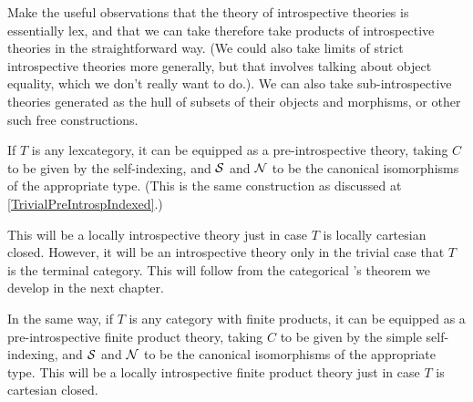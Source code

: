 \documentclass[./main.tex]{subfiles}
\begin{document}
\begin{TODOblock}
Make the useful observations that the theory of introspective theories is essentially lex, and that we can take therefore take products of introspective theories in the straightforward way. (We could also take limits of strict introspective theories more generally, but that involves talking about object equality, which we don't really want to do.). We can also take sub-introspective theories generated as the hull of subsets of their objects and morphisms, or other such free constructions.
\end{TODOblock}

\begin{construction}\label{TrivialPreIntrosp}
If $T$ is any lexcategory, it can be equipped as a pre-introspective theory, taking $C$ to be given by the self-indexing, and $\mathcal{S}$ and $\mathcal{N}$ to be the canonical isomorphisms of the appropriate type. (This is the same construction as discussed at \cref{TrivialPreIntrospIndexed}.)

This will be a locally introspective theory just in case $T$ is locally cartesian closed. However, it will be an introspective theory only in the trivial case that $T$ is the terminal category. This will follow from the categorical \Loeb's theorem we develop in the next chapter.

In the same way, if $T$ is any category with finite products, it can be equipped as a pre-introspective finite product theory, taking $C$ to be given by the simple self-indexing, and $\mathcal{S}$ and $\mathcal{N}$ to be the canonical isomorphisms of the appropriate type. This will be a locally introspective finite product theory just in case $T$ is cartesian closed.

\end{construction}
\end{document}
